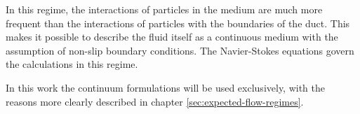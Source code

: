 	In this regime, the interactions of particles in the medium are much more frequent than the interactions of particles with the boundaries of the duct.
	This makes it possible to describe the fluid itself as a continuous medium with the assumption of non-slip boundary conditions.
	The Navier-Stokes equations govern the calculations in this regime.

	

	In this work the continuum formulations will be used exclusively, with the reasons more clearly described in chapter \ref{sec:expected-flow-regimes}.
	\cite{rapp2017microfluidics, putignano2012supersonic, halwidl_development_2016, leishman_internal_2023}
